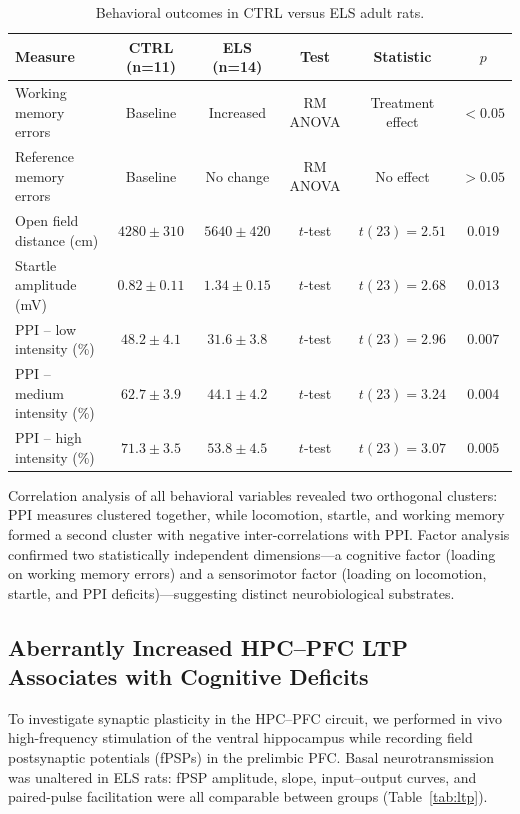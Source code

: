 \documentclass[11pt]{article}
\begin{document}
\begin{table}[H]
\centering
\caption{Behavioral outcomes in CTRL versus ELS adult rats.}
\label{tab:behavior}
\begin{tabular}{lccccc}
\toprule
\textbf{Measure} & \textbf{CTRL (n=11)} & \textbf{ELS (n=14)} & \textbf{Test} & \textbf{Statistic} & \textbf{$p$} \\
\midrule
Working memory errors & Baseline & Increased & RM ANOVA & Treatment effect & $<0.05$ \\
Reference memory errors & Baseline & No change & RM ANOVA & No effect & $>0.05$ \\
Open field distance (cm) & $4280 \pm 310$ & $5640 \pm 420$ & $t$-test & $t(23)=2.51$ & $0.019$ \\
Startle amplitude (mV) & $0.82 \pm 0.11$ & $1.34 \pm 0.15$ & $t$-test & $t(23)=2.68$ & $0.013$ \\
PPI -- low intensity (\%) & $48.2 \pm 4.1$ & $31.6 \pm 3.8$ & $t$-test & $t(23)=2.96$ & $0.007$ \\
PPI -- medium intensity (\%) & $62.7 \pm 3.9$ & $44.1 \pm 4.2$ & $t$-test & $t(23)=3.24$ & $0.004$ \\
PPI -- high intensity (\%) & $71.3 \pm 3.5$ & $53.8 \pm 4.5$ & $t$-test & $t(23)=3.07$ & $0.005$ \\
\bottomrule
\end{tabular}
\end{table}

Correlation analysis of all behavioral variables revealed two orthogonal clusters: PPI measures clustered together, while locomotion, startle, and working memory formed a second cluster with negative inter-correlations with PPI. Factor analysis confirmed two statistically independent dimensions---a cognitive factor (loading on working memory errors) and a sensorimotor factor (loading on locomotion, startle, and PPI deficits)---suggesting distinct neurobiological substrates.

\subsection{Aberrantly Increased HPC--PFC LTP Associates with Cognitive Deficits}

To investigate synaptic plasticity in the HPC--PFC circuit, we performed in vivo high-frequency stimulation of the ventral hippocampus while recording field postsynaptic potentials (fPSPs) in the prelimbic PFC. Basal neurotransmission was unaltered in ELS rats: fPSP amplitude, slope, input--output curves, and paired-pulse facilitation were all comparable between groups (Table~\ref{tab:ltp}).
\end{document}

